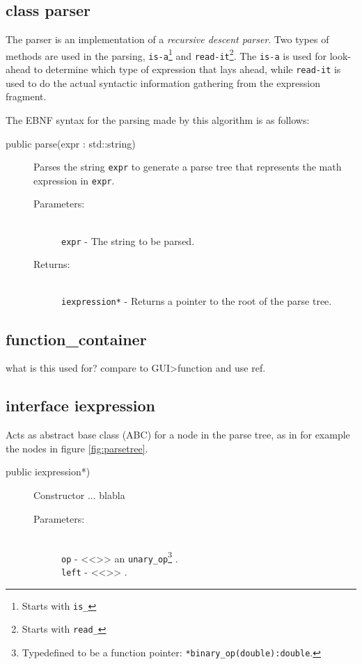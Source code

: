 \documentclass[a4paper,11pt]{kth-mag}
\begin{document}
\subsection{class parser}
The parser is an implementation of a \emph{recursive descent parser}. Two
types of methods are used in the parsing, \texttt{is-a}\footnote{Starts with
\texttt{is\_}} and \texttt{read-it}\footnote{Starts with \texttt{read\_}}.
The \texttt{is-a} is used for look-ahead to determine which type of expression
that lays ahead, while \texttt{read-it} is used to do the actual syntactic 
information gathering from the expression fragment.

The EBNF syntax for the parsing made by this algorithm is as follows:\\


\begin{description}
    \item[public parse(expr : std::string)] Parses the string \texttt{expr} to
    generate a parse tree that represents the math expression in \texttt{expr}.
    \begin{description}
            \item[Parameters:]~\\
                \verb+expr+ - The string to be parsed.
            \item[Returns:]~\\
                \verb+iexpression*+ - Returns a pointer to the root of the
                parse tree.
        \end{description}
\end{description}

\subsection{function\_container}
what is this used for? compare to GUI>function and use ref.
\subsection{interface iexpression}
\label{sec:iexpression}
Acts as abstract base class (ABC) for a node in the parse
tree, as in for example the nodes in figure \ref{fig:parsetree}.
\begin{description}
    \item[public iexpression*)] Constructor ...
    blabla 
    \begin{description}
            \item[Parameters:]~\\
                \verb+op+ - <<>> an \texttt{unary\_op}\footnote{Typedefined to
                be a function pointer: \texttt{*binary\_op(double):double}.} .\\
                \verb+left+ - <<>> .
        \end{description}
\end{description}
\end{document}
